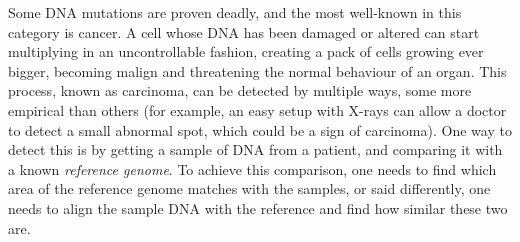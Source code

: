 Some DNA mutations are proven deadly, and the most well-known in this category is cancer. A cell whose DNA has been damaged or altered can start multiplying in an uncontrollable fashion, creating a pack of cells growing ever bigger, becoming malign and threatening the normal behaviour of an organ. This process, known as carcinoma, can be detected by multiple ways, some more empirical than others (for example, an easy setup with X-rays can allow a doctor to detect a small abnormal spot, which could be a sign of carcinoma). One way to detect this is by getting a sample of DNA from a patient, and comparing it with a known \textit{reference genome}.
To achieve this comparison, one needs to find which area of the reference genome matches with the samples, or said differently, one needs to align the sample DNA with the reference and find how similar these two are.

 



